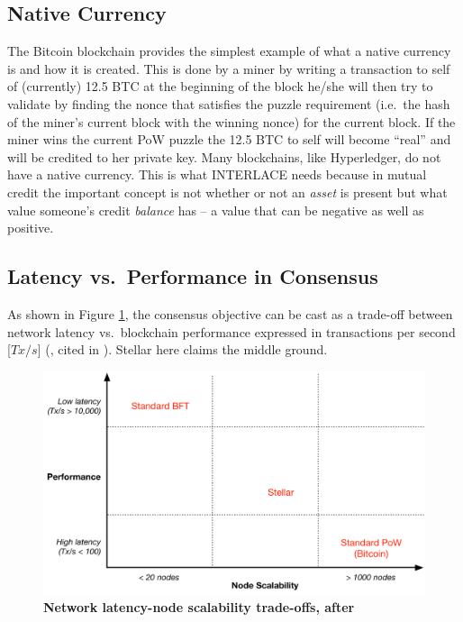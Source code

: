 \subsection{Native Currency}
The Bitcoin blockchain provides the simplest example of what a native currency is and how it is created. This is done by a miner by writing a transaction to self of (currently) 12.5 BTC at the beginning of the block he/she will then try to validate by finding the nonce that satisfies the puzzle requirement (i.e.\ the hash of the miner's current block with the winning nonce) for the current block. If the miner wins the current PoW puzzle the 12.5 BTC to self will become ``real'' and will be credited to her private key. Many blockchains, like Hyperledger, do not have a native currency. This is what INTERLACE needs because in mutual credit the important concept is not whether or not an \emph{asset} is present but what value someone's credit \emph{balance} has -- a value that can be negative as well as positive.


\subsection{Latency vs.\ Performance in Consensus}
As shown in Figure \ref{fig:consensus_tradeoffs}, the consensus objective can be cast as a trade-off between network latency vs.\ blockchain performance expressed in transactions per second [$Tx/s$] (\cite{vukolic2015}, cited in \cite{AndroulakiEtAl2018}). Stellar here claims the middle ground.


\begin{figure}[h]
\centering
\includegraphics[width=14 cm]{Figures/consensus_tradeoffs}
\caption{\bf \small Network latency-node scalability trade-offs, after \cite{vukolic2015}}
\label{fig:consensus_tradeoffs}
\end{figure}









